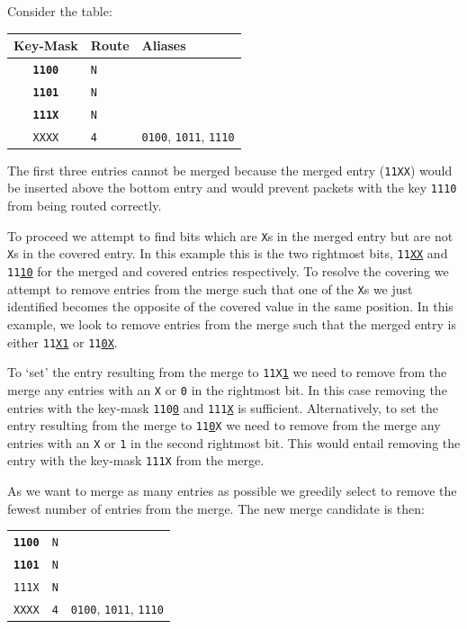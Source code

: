\documentclass[conference]{IEEEtran}
\newcommand{\mytt}[1]{\texttt{\footnotesize#1}}
\begin{document}
  Consider the table:

  \begin{table}[H]
    \centering
    \begin{tabular}{c l l}
      \toprule
      Key-Mask & Route & Aliases \\
      \midrule
      \textbf{\texttt{1100}} & \texttt{N} \\
      \textbf{\texttt{1101}} & \texttt{N} \\
      \textbf{\texttt{111X}} & \texttt{N} \\
      \texttt{XXXX} & \texttt{4} & \texttt{0100}, \texttt{1011}, \texttt{1110} \\
      \bottomrule
    \end{tabular}
  \end{table}

  The first three entries cannot be merged because the merged entry (\mytt{11XX}) would be inserted above the bottom entry and would prevent packets with the key \mytt{1110} from being routed correctly.

  To proceed we attempt to find bits which are \mytt{X}s in the merged entry but are not \mytt{X}s in the covered entry.
  In this example this is the two rightmost bits, \mytt{11\underline{XX}} and \mytt{11\underline{10}} for the merged and covered entries respectively.
  To resolve the covering we attempt to remove entries from the merge such that one of the \mytt{X}s we just identified becomes the opposite of the covered value in the same position.
  In this example, we look to remove entries from the merge such that the merged entry is either \mytt{11\underline{X1}} or \mytt{11\underline{0X}}.

  To `set' the entry resulting from the merge to \mytt{11X\underline{1}} we need to remove from the merge any entries with an \mytt{X} or \mytt{0} in the rightmost bit.
  In this case removing the entries with the key-mask \mytt{110\underline{0}} and \mytt{111\underline{X}} is sufficient.
  Alternatively, to set the entry resulting from the merge to \mytt{11\underline{0}X} we need to remove from the merge any entries with an \mytt{X} or \mytt{1} in the second rightmost bit.
  This would entail removing the entry with the key-mask \mytt{111X} from the merge.

  As we want to merge as many entries as possible we greedily select to remove the fewest number of entries from the merge.
  The new merge candidate is then:

  \begin{table}[H]
    \centering
    \begin{tabular}{c l l}
      \toprule
      \textbf{\texttt{1100}} & \texttt{N} \\
      \textbf{\texttt{1101}} & \texttt{N} \\
      \texttt{111X} & \texttt{N} \\
      \texttt{XXXX} & \texttt{4} & \texttt{0100}, \texttt{1011}, \texttt{1110} \\
      \bottomrule
    \end{tabular}
  \end{table}
\end{document}

